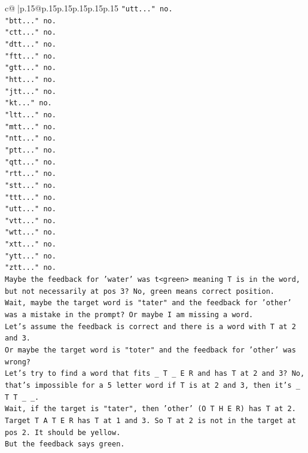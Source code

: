 \documentclass{article}
\begin{document}
{\begin{supertabular}{c@{$\;$}|p{.15\linewidth}@{}p{.15\linewidth}p{.15\linewidth}p{.15\linewidth}p{.15\linewidth}p{.15\linewidth}}
{{{\texttt{"utt..." no.} \\
\texttt{"btt..." no.} \\
\texttt{"ctt..." no.} \\
\texttt{"dtt..." no.} \\
\texttt{"ftt..." no.} \\
\texttt{"gtt..." no.} \\
\texttt{"htt..." no.} \\
\texttt{"jtt..." no.} \\
\texttt{"kt..." no.} \\
\texttt{"ltt..." no.} \\
\texttt{"mtt..." no.} \\
\texttt{"ntt..." no.} \\
\texttt{"ptt..." no.} \\
\texttt{"qtt..." no.} \\
\texttt{"rtt..." no.} \\
\texttt{"stt..." no.} \\
\texttt{"ttt..." no.} \\
\texttt{"utt..." no.} \\
\texttt{"vtt..." no.} \\
\texttt{"wtt..." no.} \\
\texttt{"xtt..." no.} \\
\texttt{"ytt..." no.} \\
\texttt{"ztt..." no.} \\
\texttt{Maybe the feedback for 'water' was t<green> meaning T is in the word, but not necessarily at pos 3? No, green means correct position.} \\
\texttt{Wait, maybe the target word is "tater" and the feedback for 'other' was a mistake in the prompt? Or maybe I am missing a word.} \\
\texttt{Let's assume the feedback is correct and there is a word with T at 2 and 3.} \\
\texttt{Or maybe the target word is "toter" and the feedback for 'other' was wrong?} \\
\texttt{Let's try to find a word that fits \_ T \_ E R and has T at 2 and 3? No, that's impossible for a 5 letter word if T is at 2 and 3, then it's \_ T T \_ \_.} \\
\texttt{Wait, if the target is "tater", then 'other' (O T H E R) has T at 2. Target T A T E R has T at 1 and 3. So T at 2 is not in the target at pos 2. It should be yellow.} \\
\texttt{But the feedback says green.} \\
}}}
\end{supertabular}}
\end{document}
